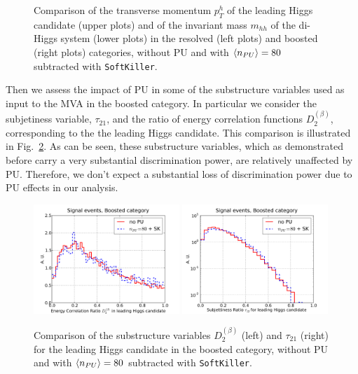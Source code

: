 \begin{figure}[t]
\begin{center}
  \caption{\small
    Comparison of the transverse momentum $p_T^h$ of the leading
    Higgs candidate (upper plots) and of the invariant mass $m_{hh}$
    of the di-Higgs system (lower plots) in the resolved
    (left plots) and boosted (right plots) categories,
    without PU and with $\left\langle n_{PU}\right\rangle=80$ subtracted with {\tt SoftKiller}.
}
\label{fig:mHH_PU}
\end{center}
\end{figure}

Then we assess the impact of PU in some of the substructure variables
used as input to the MVA in the boosted category.
%
In particular we consider the subjetiness variable,
$\tau_{21}$, and the ratio
of energy correlation functions $D_2^{(\beta)}$,
corresponding to the the leading Higgs candidate.
%
This comparison is illustrated in Fig.~\ref{fig:Substructure_PU}.
%
As can be seen, these substructure variables, which
as demonstrated before carry a very substantial
discrimination power, are relatively unaffected by PU.
%
Therefore, we don't expect a substantial loss of discrimination
power due to PU effects in our analysis.


\begin{figure}[t]
  \begin{center}
    \vspace{-1cm}
  \includegraphics[width=0.49\textwidth]{plots/D2_h0_bst_comp.pdf}
  \includegraphics[width=0.49\textwidth]{plots/tau21_h0_bst_comp.pdf}
   \caption{\small
     Comparison of the substructure variables $D_2^{(\beta)}$ (left)
     and $\tau_{21}$ (right)
     for the leading Higgs candidate in the boosted category,
   without PU and with $\left\langle n_{PU}\right\rangle=80$ subtracted with {\tt SoftKiller}.
}
\label{fig:Substructure_PU}
\end{center}
\end{figure}


